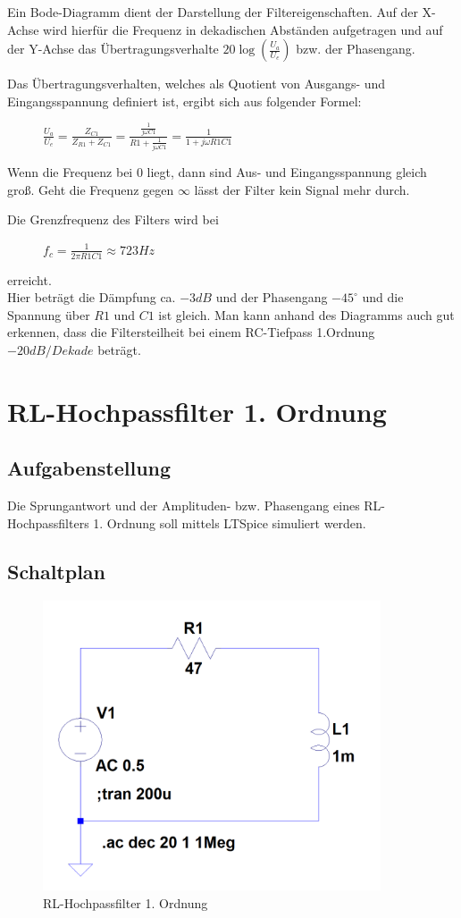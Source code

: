 \documentclass[12pt,a4paper,titlepage]{article}
\begin{document}
\noindent Ein Bode-Diagramm dient der Darstellung der Filtereigenschaften. Auf der X-Achse wird hierfür die Frequenz in dekadischen Abständen aufgetragen und auf der Y-Achse das Übertragungsverhalte $20\log(\frac{U_a}{U_e})$ bzw. der Phasengang.

\noindent Das Übertragungsverhalten, welches als Quotient von Ausgangs- und Eingangsspannung definiert ist, ergibt sich aus folgender Formel:
\begin{figure}[H]
  \centering
  $\frac{U_a}{U_e} = \frac{Z_{C1}}{Z_{R1}+Z_{C1}} = \frac{\frac{1}{j\omega C1}}{R1+\frac{1}{j\omega C1}} = \frac{1}{1+j\omega R1C1}$
\end{figure}
Wenn die Frequenz bei 0 liegt, dann sind Aus- und Eingangsspannung gleich groß. Geht die Frequenz gegen $\infty$ lässt der Filter kein Signal mehr durch.

\noindent Die Grenzfrequenz des Filters wird bei
\begin{figure}[H]
  \centering
  $f_c = \frac{1}{2\pi R1C1} \approx 723Hz$
\end{figure}
\noindent erreicht.\\
Hier beträgt die Dämpfung ca. $-3dB$ und der Phasengang $-45^{\circ}$ und die Spannung über $R1$ und $C1$ ist gleich. Man kann anhand des Diagramms auch gut erkennen, dass die Filtersteilheit bei einem RC-Tiefpass 1.Ordnung $-20dB/Dekade$ beträgt.


\newpage
\section{RL-Hochpassfilter 1. Ordnung}

\subsection{Aufgabenstellung}
Die Sprungantwort und der Amplituden- bzw. Phasengang eines RL-Hochpassfilters 1. Ordnung soll mittels LTSpice simuliert werden.

\subsection{Schaltplan}

\begin{figure}[H]
  \centering
  \includegraphics[width=100mm]{filter02_schaltung.PNG}
  \caption{RL-Hochpassfilter 1. Ordnung}
\end{figure}
\end{document}
